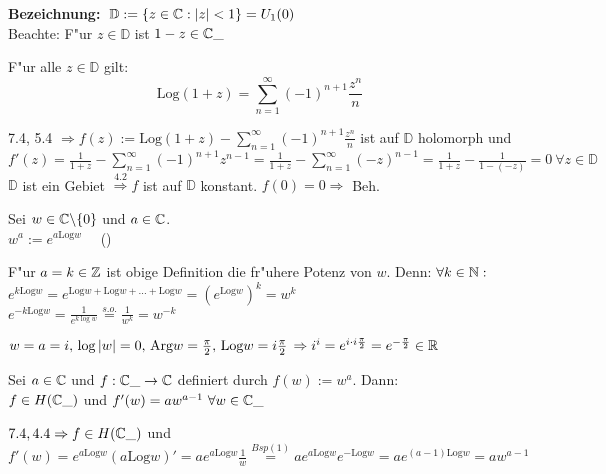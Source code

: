 \documentclass[a4paper,twoside,DIV15,BCOR12mm]{scrbook}
\def\Arg{\text{Arg}}
\def\MdD{\mathbb{D}}
\def\Log{\text{Log}}
\begin{document}
\textbf{Bezeichnung:} $\; \MdD := \{ z \in \MdC : |z| < 1 \} = U_1(0)$ \\
Beachte: F"ur $z \in \MdD$ ist $1-z \in \mathbb{C}\_$

\begin{satz}
F"ur alle $ z \in \MdD$ gilt:
\[
\Log (1+z) = \sum_{n=1}^{\infty} (-1)^{n+1} \frac{z^n}{n} 
\]
\end{satz}

\begin{beweis}
7.4, 5.4 $\Rightarrow f(z) := \Log(1+z) - \sum_{n=1}^{\infty} (-1)^{n+1} \frac{z^n}{n}$ ist auf $\MdD$ holomorph und \\
$f'(z) = \frac1{1+z} - \sum_{n=1}^{\infty} (-1)^{n+1} z^{n-1} = \frac1{1+z} - \sum_{n=1}^{\infty} (-z)^{n-1} = \frac1{1+z} - \frac1{1-(-z)} = 0 \ \forall z \in \MdD$\\
$\MdD$ ist ein Gebiet $\stackrel{4.2}{\Rightarrow} f$ ist auf $\MdD$ konstant. $f(0) = 0 \Rightarrow$ Beh.
\end{beweis}

\begin{definition}
Sei $w \in \mathbb{C} \backslash \{0\}$ und $a \in \mathbb{C}$.\\
$w^a := e^{a \Log w} \quad $ ()
\end{definition}

\begin{beispiele}
\item F"ur $a= k \in \mathbb{Z}$ ist obige Definition die fr"uhere Potenz von $w$. Denn: $\forall k \in \mathbb{N}:$ \\
$e^{k \Log w} = e^{\Log w + \Log w + \dots + \Log w} = \left(e^{\Log w}\right)^k = w^k$\\
$e^{-k \Log w} = \frac1{e^{k \log w}} \stackrel{s.o.}{=} \frac1{w^k} = w^{-k}$
\item $w=a=i, \, \log|w| = 0, \, \Arg w = \frac{\pi}2, \, \Log w = i \frac{\pi}{2} \, \Rightarrow i^i = e^{i\cdot i \frac{\pi}{2}} = e^{-\frac{\pi}{2}} \in \MdR$
\end{beispiele}

\begin{satz}
Sei $a \in \mathbb{C}$ und $f: \mathbb{C}\_ \rightarrow \mathbb{C}$ definiert durch $f(w) := w^a$. Dann: \\
$f \in H(\mathbb{C}\_)$ und $f'(w) = aw^{a-1} \ \forall w \in \mathbb{C}\_$
\end{satz}

\begin{beweis}
$7.4, 4.4 \Rightarrow f \in H(\mathbb{C}\_)$ und $f'(w) = e^{a \Log w}(a \Log w)' = ae^{a \Log w}\frac1w \stackrel{Bsp(1)}{=} ae^{a \Log w}e^{- \Log w} = ae^{(a-1) \Log w} = aw^{a-1}$
\end{beweis}
\end{document}
